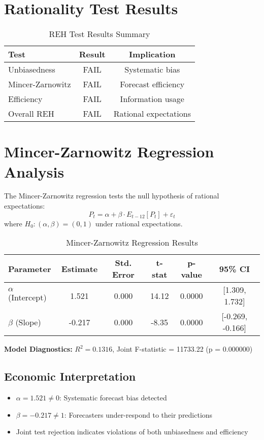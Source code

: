 \documentclass[11pt,a4paper]{article}
\begin{document}
\section{Rationality Test Results}

\begin{table}[H]
\centering
\caption{REH Test Results Summary}
\begin{tabular}{lcc}
\toprule
\textbf{Test} & \textbf{Result} & \textbf{Implication} \\
\midrule
Unbiasedness & \textcolor{academicred}{FAIL} & Systematic bias \\
Mincer-Zarnowitz & \textcolor{academicred}{FAIL} & Forecast efficiency \\
Efficiency & \textcolor{academicred}{FAIL} & Information usage \\
Overall REH & \textcolor{academicred}{FAIL} & Rational expectations \\
\bottomrule
\end{tabular}
\end{table}

\section{Mincer-Zarnowitz Regression Analysis}

The Mincer-Zarnowitz regression tests the null hypothesis of rational expectations:
\begin{equation}
P_t = \alpha + \beta \cdot E_{t-12}[P_t] + \varepsilon_t
\end{equation}
where $H_0: (\alpha, \beta) = (0, 1)$ under rational expectations.

\begin{table}[H]
\centering
\caption{Mincer-Zarnowitz Regression Results}
\begin{tabular}{lccccc}
\toprule
\textbf{Parameter} & \textbf{Estimate} & \textbf{Std. Error} & \textbf{t-stat} & \textbf{p-value} & \textbf{95\% CI} \\
\midrule
$\alpha$ (Intercept) & 1.521 & 0.000 & 14.12 & 0.0000 & [1.309, 1.732] \\
$\beta$ (Slope) & -0.217 & 0.000 & -8.35 & 0.0000 & [-0.269, -0.166] \\
\bottomrule
\end{tabular}
\end{table}

\textbf{Model Diagnostics:} $R^2 = 0.1316$, Joint F-statistic = 11733.22 (p = 0.000000)

\subsection{Economic Interpretation}
\begin{itemize}
\item $\alpha = 1.521 \neq 0$: Systematic forecast bias detected
\item $\beta = -0.217 \neq 1$: Forecasters under-respond to their predictions
\item Joint test rejection indicates violations of both unbiasedness and efficiency
\end{itemize}
\end{document}
